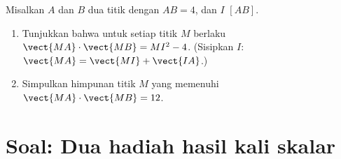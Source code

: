 \begin{exercise}[$\star\star\star$]\label{exo:g11:scal:11}
Misalkan $A$ dan $B$ dua titik dengan $AB = 4$, dan $I$ 
$[AB]$.
\begin{enumerate}
  \item Tunjukkan bahwa untuk setiap titik $M$ berlaku
        $\vect{MA}\cdot\vect{MB} = MI^2 - 4$.
        (Sisipkan $I$: $\vect{MA} = \vect{MI} + \vect{IA}$.)
  \item Simpulkan himpunan titik $M$ yang memenuhi
        $\vect{MA}\cdot\vect{MB} = 12$.
\end{enumerate}
\end{exercise}

\section{Soal: Dua hadiah hasil kali skalar}

